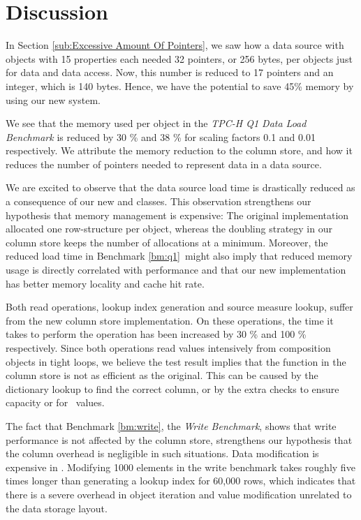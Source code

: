 \section{Discussion}
\label{sec:Discussion}
In Section \ref{sub:Excessive Amount Of Pointers}, we saw how a data source with objects with 15 properties each needed 32 pointers, or 256 bytes, per objects just for data and data access. Now, this number is reduced to 17 pointers and an integer, which is 140 bytes. Hence, we have the potential to save 45\% memory by using our new system.

We see that the memory used per object in the \textit{TPC-H Q1 Data Load Benchmark} is reduced by 30 \% and 38 \% for scaling factors 0.1 and 0.01 respectively. We attribute the memory reduction to the column store, and how it reduces the number of pointers needed to represent data in a data source.

We are excited to observe that the data source load time is drastically reduced as a consequence of our new  and  classes. This observation strengthens our hypothesis that memory management is expensive: The original implementation allocated one row-structure per object, whereas the doubling strategy in our column store keeps the number of allocations at a minimum. Moreover, the reduced load time in Benchmark \ref{bm:q1}~might also imply that reduced memory usage is directly correlated with performance and that our new implementation has better memory locality and cache hit rate.

Both read operations, lookup index generation and source measure lookup, suffer from the new column store implementation. On these operations, the time it takes to perform the operation has been increased by 30 \% and 100 \% respectively. Since both operations read values intensively from composition objects in tight loops, we believe the test result implies that the  function in the column store is not as efficient as the original. This can be caused by the dictionary lookup to find the correct column, or by the extra checks to ensure capacity or for \nil~values.

The fact that Benchmark \ref{bm:write}, the \textit{Write Benchmark}, shows that write performance is not affected by the column store, strengthens our hypothesis that the column overhead is negligible in such situations. Data modification is expensive in \gap. Modifying 1000 elements in the write benchmark takes roughly five times longer than generating a lookup index for 60,000 rows, which indicates that there is a severe overhead in object iteration and value modification unrelated to the data storage layout.

